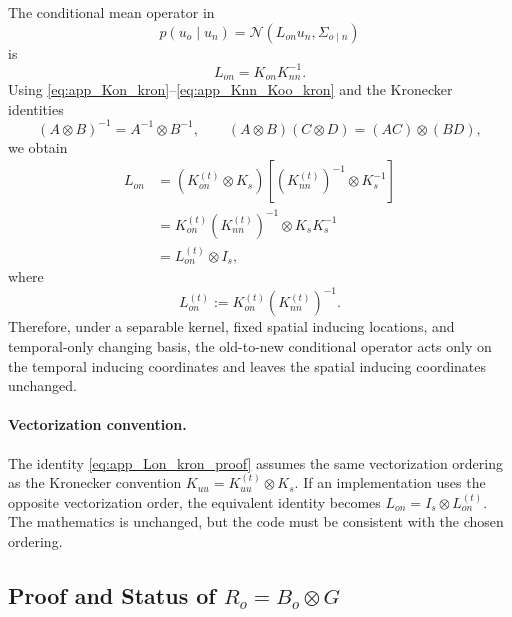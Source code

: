 \documentclass[12pt]{article}
\begin{document}
The conditional mean operator in
\begin{equation}
    p(u_o\mid u_n)
    =
    \mathcal{N}
    \left(
        L_{on}u_n,
        \Sigma_{o\mid n}
    \right)
\end{equation}
is
\begin{equation}
    L_{on}
    =
    K_{on}K_{nn}^{-1}.
\end{equation}
Using \eqref{eq:app_Kon_kron}--\eqref{eq:app_Knn_Koo_kron} and the
Kronecker identities
\begin{equation}
    (A\otimes B)^{-1}=A^{-1}\otimes B^{-1},
    \qquad
    (A\otimes B)(C\otimes D)=(AC)\otimes(BD),
\end{equation}
we obtain
\begin{align}
    L_{on}
    &=
    \left(
        K_{on}^{(t)}\otimes K_s
    \right)
    \left[
        \left(K_{nn}^{(t)}\right)^{-1}
        \otimes
        K_s^{-1}
    \right]                                                     \\
    &=
    K_{on}^{(t)}
    \left(K_{nn}^{(t)}\right)^{-1}
    \otimes
    K_sK_s^{-1}                                                  \\
    &=
    L_{on}^{(t)}\otimes I_s,
    \label{eq:app_Lon_kron_proof}
\end{align}
where
\begin{equation}
    L_{on}^{(t)}
    :=
    K_{on}^{(t)}
    \left(K_{nn}^{(t)}\right)^{-1}.
\end{equation}
Therefore, under a separable kernel, fixed spatial inducing locations, and
temporal-only changing basis, the old-to-new conditional operator acts
only on the temporal inducing coordinates and leaves the spatial inducing
coordinates unchanged.

\paragraph{Vectorization convention.}
The identity \eqref{eq:app_Lon_kron_proof} assumes the same vectorization
ordering as the Kronecker convention \(K_{uu}=K_{uu}^{(t)}\otimes K_s\).
If an implementation uses the opposite vectorization order, the equivalent
identity becomes \(L_{on}=I_s\otimes L_{on}^{(t)}\). The mathematics is
unchanged, but the code must be consistent with the chosen ordering.

\subsection{\texorpdfstring{Proof and Status of \(R_o=B_o\otimes G\)}{Proof and Status of Ro = Bo tensor G}}
\label{app:proof_Ro_kron_natural_stat}
\end{document}
